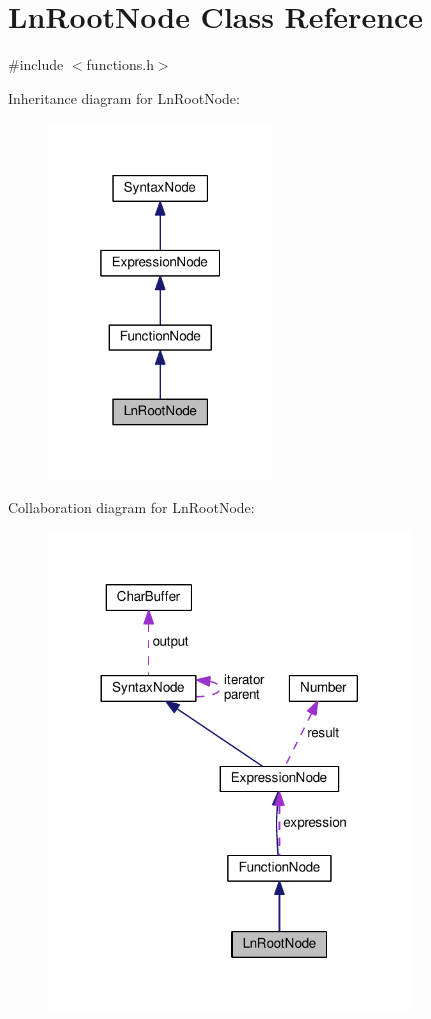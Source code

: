 \hypertarget{classLnRootNode}{}\section{Ln\+Root\+Node Class Reference}
\label{classLnRootNode}


{\ttfamily \#include $<$functions.\+h$>$}



Inheritance diagram for Ln\+Root\+Node\+:
\nopagebreak
\begin{figure}[H]
\begin{center}
\leavevmode
\includegraphics[width=169pt]{d8/d8b/classLnRootNode__inherit__graph}
\end{center}
\end{figure}


Collaboration diagram for Ln\+Root\+Node\+:
\nopagebreak
\begin{figure}[H]
\begin{center}
\leavevmode
\includegraphics[width=272pt]{d3/df7/classLnRootNode__coll__graph}
\end{center}
\end{figure}
